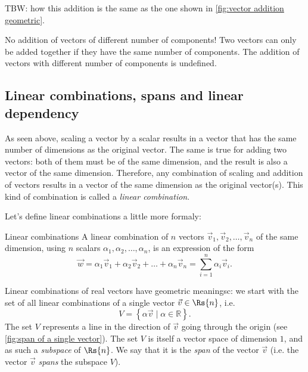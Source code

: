 TBW: how this addition is the same as the one shown in \autoref{fig:vector addition geometric}.

\begin{note}{No addition of vectors of different number of components!}{}
	Two vectors can only be added together if they have the same number of components. The addition of vectors with different number of components is undefined.
\end{note}

\subsection{Linear combinations, spans and linear dependency}
As seen above, scaling a vector by a scalar results in a vector that has the same number of dimensions as the original vector. The same is true for adding two vectors: both of them must be of the same dimension, and the result is also a vector of the same dimension. Therefore, any combination of scaling and addition of vectors results in a vector of the same dimension as the original vector(s). This kind of combination is called a \emph{linear combination}.

Let's define linear combinations a little more formaly:

\begin{definition}{Linear combinations}{}
	A linear combination of $n$ vectors $\vec{v}_{1}, \vec{v}_{2}, \dots, \vec{v}_{n}$ of the same dimension, using $n$ scalars $\alpha_{1},\alpha_{2},\dots,\alpha_{n}$, is an expression of the form
	\begin{equation}
		\vec{w} = \alpha_{1}\vec{v}_{1} + \alpha_{2}\vec{v}_{2} + \dots + \alpha_{n}\vec{v}_{n} = \sum\limits_{i=1}^{n}\alpha_{i}\vec{v}_{i}.
		\label{eq:linear combination}
	\end{equation}
\end{definition}

Linear combinations of real vectors have geometric meaningsc: we start with the set of all linear combinations of a single vector $\vec{v}\in\Rs{n}$, i.e.
\begin{equation}
	V = \left\{\alpha\vec{v} \mid \alpha\in\mathbb{R} \right\}.
	\label{eq:span of a single vector}
\end{equation}
The set $V$ represents a line in the direction of $\vec{v}$ going through the origin (see \autoref{fig:span of a single vector}). The set $V$ is itself a vector space of dimension $1$, and as such a \emph{subspace} of $\Rs{n}$. We say that it is the \emph{span} of the vector $\vec{v}$ (i.e. the vector $\vec{v}$ \emph{spans} the subspace $V$).

